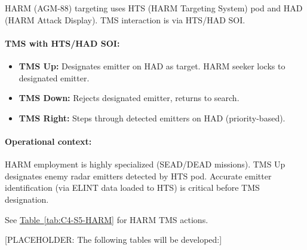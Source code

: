 \documentclass[11pt, a4paper, twoside]{report}
\newenvironment{hotastable}[1]{%
	\footnotesize
	\setlength{\tabcolsep}{3pt}
	\renewcommand{\arraystretch}{1.35}
	\begin{longtable}{L{1.00cm} L{0.90cm} L{0.90cm} L{3.30cm} L{6.40cm} L{1.40cm} L{1.60cm}}
		\caption{#1}\label{table.\thetable}\\
		\noalign{\addtocontents{hotas}{\protect\contentsline{table}{\protect\numberline{\thetable}#1}{\thepage}{table.\thetable}}}%
		\rowcolor{headerblue}
		\multicolumn{1}{>{\centering\arraybackslash}p{1.00cm}}{\textbf{\color{white}Mode}} &
		\multicolumn{1}{>{\centering\arraybackslash}p{0.90cm}}{\textbf{\color{white}Dir.}} &
		\multicolumn{1}{>{\centering\arraybackslash}p{0.90cm}}{\textbf{\color{white}Act.}} &
		\multicolumn{1}{>{\centering\arraybackslash}p{3.30cm}}{\textbf{\color{white}Function}} &
		\multicolumn{1}{>{\centering\arraybackslash}p{6.40cm}}{\textbf{\color{white}Effect / Nuance}} &
		\multicolumn{1}{>{\centering\arraybackslash}p{1.40cm}}{\textbf{\color{white}Dash34}} &
		\multicolumn{1}{>{\centering\arraybackslash}p{1.60cm}}{\textbf{\color{white}Train.}} \\
		\endfirsthead
		\rowcolor{headerblue}
		\multicolumn{1}{>{\centering\arraybackslash}p{1.00cm}}{\textbf{\color{white}Mode}} &
		\multicolumn{1}{>{\centering\arraybackslash}p{0.90cm}}{\textbf{\color{white}Dir.}} &
		\multicolumn{1}{>{\centering\arraybackslash}p{0.90cm}}{\textbf{\color{white}Act.}} &
		\multicolumn{1}{>{\centering\arraybackslash}p{3.30cm}}{\textbf{\color{white}Function}} &
		\multicolumn{1}{>{\centering\arraybackslash}p{6.40cm}}{\textbf{\color{white}Effect / Nuance}} &
		\multicolumn{1}{>{\centering\arraybackslash}p{1.40cm}}{\textbf{\color{white}Dash34}} &
		\multicolumn{1}{>{\centering\arraybackslash}p{1.60cm}}{\textbf{\color{white}Train.}} \\
		\endhead
		\multicolumn{7}{r}{\small\emph{Continued on next page}}\\
		\endfoot
		\endlastfoot
	}{%
	\end{longtable}
}
\newcommand{\tabref}[1]{\hyperref[#1]{Table~\ref*{#1}}}
\begin{document}
HARM (AGM-88) targeting uses HTS (HARM Targeting System) pod and HAD (HARM Attack Display). TMS interaction is via HTS/HAD SOI.

\paragraph{TMS with HTS/HAD SOI:}
\begin{itemize}
    \item \textbf{TMS Up:} Designates emitter on HAD as target. HARM seeker locks to designated emitter.
    \item \textbf{TMS Down:} Rejects designated emitter, returns to search.
    \item \textbf{TMS Right:} Steps through detected emitters on HAD (priority-based).
\end{itemize}

\paragraph{Operational context:}
HARM employment is highly specialized (SEAD/DEAD missions). TMS Up designates enemy radar emitters detected by HTS pod. Accurate emitter identification (via ELINT data loaded to HTS) is critical before TMS designation.

See \tabref{tab:C4-S5-HARM} for HARM TMS actions.


[PLACEHOLDER: The following tables will be developed:]


\end{document}
